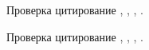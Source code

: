 % 


% 
% 

% 


Проверка цитирование \cite{ll5}, \cite{ll9}, \cite{tinkham}, \cite{cooper}.


% 





\newpage




\newpage
Проверка цитирование \cite{ll5}, \cite{ll9}, \cite{tinkham}, \cite{cooper}.

